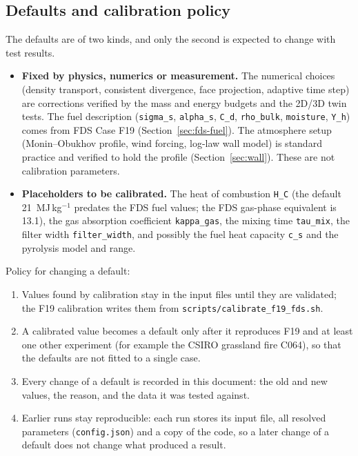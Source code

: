 \documentclass[11pt,a4paper]{article}
\newcommand{\code}[1]{\texttt{#1}}
\begin{document}
\subsection{Defaults and calibration policy}\label{sec:defaults}
The defaults are of two kinds, and only the second is expected to change with test results.
\begin{itemize}
  \item \textbf{Fixed by physics, numerics or measurement.} The numerical choices (density transport,
        consistent divergence, face projection, adaptive time step) are corrections verified by the mass
        and energy budgets and the 2D/3D twin tests. The fuel description (\code{sigma\_s},
        \code{alpha\_s}, \code{C\_d}, \code{rho\_bulk}, \code{moisture}, \code{Y\_h}) comes from FDS
        Case F19 (Section~\ref{sec:fds-fuel}). The atmosphere setup (Monin--Obukhov profile, wind forcing,
        log-law wall model) is standard practice and verified to hold the profile
        (Section~\ref{sec:wall}). These are not calibration parameters.
  \item \textbf{Placeholders to be calibrated.} The heat of combustion \code{H\_C} (the default
        21~MJ\,kg$^{-1}$ predates the FDS fuel values; the FDS gas-phase equivalent is 13.1), the gas
        absorption coefficient \code{kappa\_gas}, the mixing time \code{tau\_mix}, the filter width
        \code{filter\_width}, and possibly the fuel heat capacity \code{c\_s} and the pyrolysis model
        and range.
\end{itemize}
Policy for changing a default:
\begin{enumerate}
  \item Values found by calibration stay in the input files until they are validated; the F19
        calibration writes them from \code{scripts/calibrate\_f19\_fds.sh}.
  \item A calibrated value becomes a default only after it reproduces F19 and at least one other
        experiment (for example the CSIRO grassland fire C064), so that the defaults are not fitted to a
        single case.
  \item Every change of a default is recorded in this document: the old and new values, the reason, and
        the data it was tested against.
  \item Earlier runs stay reproducible: each run stores its input file, all resolved parameters
        (\code{config.json}) and a copy of the code, so a later change of a default does not change
        what produced a result.
\end{enumerate}
\end{document}
